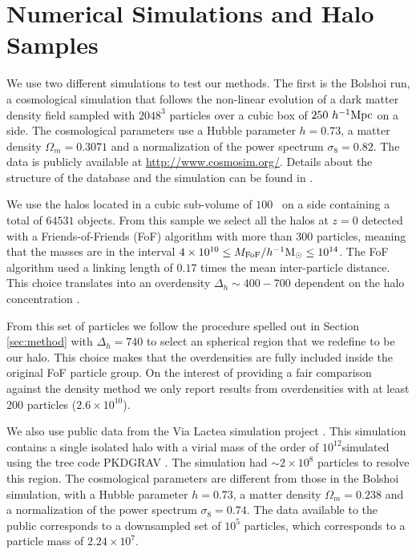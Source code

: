 \documentclass{emulateapj}
\newcommand{\hMpc}{{\ifmmode{h^{-1}{\rm Mpc}}\else{$h^{-1}$Mpc}\fi}}
\newcommand{\hMsun}{{\ifmmode{h^{-1}{\rm {M_{\odot}}}}\else{$h^{-1}{\rm{M_{\odot}}}$}\fi}}
\begin{document}
\section{Numerical Simulations and Halo Samples}

We use two different simulations to test our methods.
The first is the Bolshoi run, a cosmological simulation that follows
the non-linear evolution of a dark matter density field sampled with
$2048^3$ particles over a cubic box of $250\ \hMpc$ on a side.   The
cosmological parameters use a Hubble parameter $h=0.73$, a matter
density $\Omega_m=0.3071$ and a normalization of the power spectrum
$\sigma_8=0.82$. 
The data is publicly available at \url{http://www.cosmosim.org/}.  
Details about the structure of the database and the simulation can be
found in \citep{2011ApJ...740..102K,2013AN....334..691R}.

We use the halos located in a cubic sub-volume of $100$ \hMpc\ on a
side containing a total of $64531$ objects.
From this sample we select all the halos at $z=0$ detected with a
Friends-of-Friends (FoF) algorithm with more than 300 particles,
meaning that the masses are in the interval $4\times 10^{10}\leq
M_{\rm FoF}/\hMsun \leq 10^{14}$.  The FoF algorithm used a linking
length of $0.17$ times the mean inter-particle distance.  
This choice translates into an overdensity $\Delta_h\sim 400-700$
dependent on the halo concentration \citep{More2011}.

From this set of particles we follow the procedure spelled out in
Section \ref{sec:method} with $\Delta_h=740$ to select an spherical
region that we redefine to be our halo.  
This choice makes that the overdensities are fully included inside the
original FoF particle group.   
On the interest of providing a fair comparison against the density
method we only report results from overdensities with at least $200$
particles ($2.6\times 10^{10}$\hMsun). 

We also use public data from the Via Lactea simulation project
\citep{2008Natur.454..735D}.  
This simulation contains a single isolated halo with a virial mass
of the order of $10^{12}$\hMsun simulated using the tree code PKDGRAV
\citep{2001PhDT........21S}.  
The simulation had $\sim 2\times 10^{8}$ particles to resolve this
region.
The cosmological parameters are different from those in the Bolshoi
simulation, with a Hubble parameter $h=0.73$, a matter density
$\Omega_m=0.238$ and a normalization of the power spectrum
$\sigma_8=0.74$. 
The data available to the public corresponds to a downsampled set 
of $10^5$ particles, which corresponds to a particle mass of
$2.24\times 10^{7}$\hMsun.  
\end{document}
